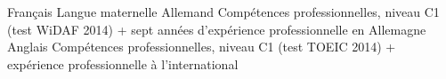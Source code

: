 

\begin{cvskills}

  \cvskill
    {Français} %
    {Langue maternelle} %
  \cvskill
	{Allemand} %
	{Compétences professionnelles, niveau C1 (test WiDAF 2014) + sept années d'expérience professionnelle en Allemagne} %
  \cvskill
	{Anglais} %
	{Compétences professionnelles, niveau C1 (test TOEIC 2014) + expérience professionnelle à l'international} %
\end{cvskills}
